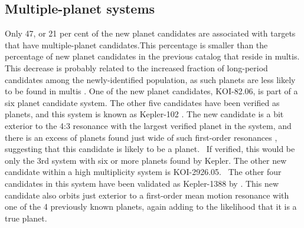 \subsection{Multiple-planet systems}
Only 47, or 21 per cent of the new planet candidates are associated with targets that have multiple-planet candidates.This percentage is smaller than the percentage of new planet candidates in the previous catalog that reside in multis.  This decrease is probably related to the increased fraction of long-period candidates among the newly-identified population, as such planets are less likely to be found in multis \citep{Lissauer2014}. One of the new planet candidates, KOI-82.06, is part of a six planet candidate system. The other five candidates have been verified as planets, and this system is known as Kepler-102 \citep{Marcy2014,Rowe2014}. The new candidate is a bit exterior to the 4:3 resonance with the largest verified planet in the system, and there is an excess of planets found just wide of such first-order resonances \citep{Lissauer2011}, suggesting that this candidate is likely to be a planet.  If verified, this would be only the 3rd system with six or more planets found by Kepler. 
The other new candidate within a high multiplicity system is KOI-2926.05.  The other four candidates in this system have been validated as Kepler-1388 by \citet{Morton2016}. This new candidate also orbits just exterior to a first-order mean motion resonance with one of the 4 previously known planets, again adding to the likelihood that it is a true planet.
